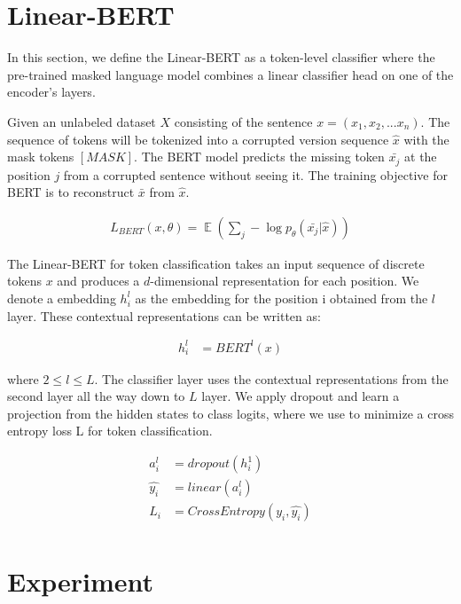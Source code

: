\documentclass[11pt,a4paper]{article}
\DeclareMathOperator{\EX}{\mathbb{E}}%
\begin{document}
\section{Linear-BERT}


In this section, we define the Linear-BERT as a token-level classifier where the pre-trained masked language model combines a linear classifier head on one of the encoder's layers.

Given an unlabeled dataset $X$ consisting of the sentence $x = (x_{1}, x_{2}, ...{x_n})$. The sequence of tokens will be tokenized into a corrupted version sequence $\hat{x}$ with the mask tokens ${[MASK]}$. The BERT model predicts the missing token $\bar{x_{j}}$ at the position $j$ from a corrupted sentence without seeing it. The training objective for BERT is to reconstruct $\bar{x}$ from $\hat{x}$.

\begin{align*}
    L_{BERT}(x, \theta) = \EX(\sum_{j} - \log p_{\theta}(\bar{x_{j}}| \hat{x}))
\end{align*}


The Linear-BERT for token classification takes an input sequence of discrete tokens ${x}$ and produces a $d$-dimensional representation for each position. We denote a embedding $h_{i}^{l}$ as the embedding for the position {i} obtained from the $l$ layer. These contextual representations can be written as:

\begin{align*}
    h_{i}^{l} &= BERT^{l}(x) 
\end{align*}

where $2 \leq l \leq L$. The classifier layer uses the contextual representations from the second layer all the way down to $L$ layer. We apply dropout and learn a projection from the hidden states to class logits, where we use to minimize a cross entropy loss L for token classification. 


\begin{align*}
    a_{i}^{l} &=  dropout(h_{i}^{1}) \\
    \hat{y_{i}} &= linear(a_{i}^{l}) \\
    L_{i} &= CrossEntropy(y_{i}, \hat{y_{i}}) \\
\end{align*}


\section{Experiment}
\end{document}
